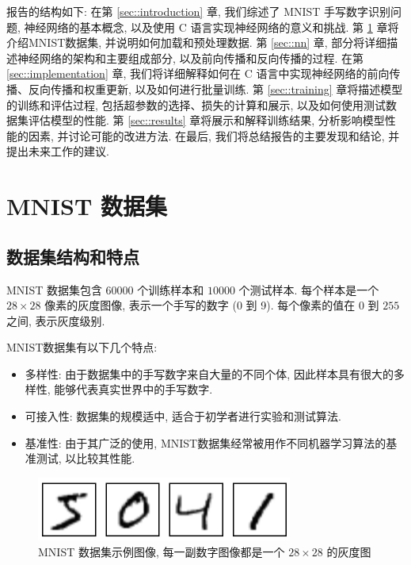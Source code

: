 \documentclass{ctexart}
\begin{document}
报告的结构如下: 在第 \ref{sec::introduction} 章, 我们综述了 MNIST 手写数字识别问题,
神经网络的基本概念, 以及使用 C 语言实现神经网络的意义和挑战. 第 \ref{sec::mnist} 章将介绍MNIST数据集,
并说明如何加载和预处理数据. 第 \ref{sec::nn} 章,
部分将详细描述神经网络的架构和主要组成部分, 以及前向传播和反向传播的过程.
在第 \ref{sec::implementation} 章, 我们将详细解释如何在 C 语言中实现神经网络的前向传播、反向传播和权重更新,
以及如何进行批量训练. 第 \ref{sec::training} 章将描述模型的训练和评估过程, 包括超参数的选择、损失的计算和展示,
以及如何使用测试数据集评估模型的性能. 第 \ref{sec::results} 章将展示和解释训练结果, 分析影响模型性能的因素,
并讨论可能的改进方法. 在最后, 我们将总结报告的主要发现和结论, 并提出未来工作的建议.

\section{MNIST 数据集}
\label{sec::mnist}

\subsection{数据集结构和特点}

MNIST 数据集包含 $60000$ 个训练样本和 $10000$ 个测试样本. 每个样本是一个 $28\times 28$ 像素的灰度图像,
表示一个手写的数字 (0 到 9). 每个像素的值在 $0$ 到 $255$ 之间, 表示灰度级别.

MNIST数据集有以下几个特点:

\begin{itemize}
    \item 多样性: 由于数据集中的手写数字来自大量的不同个体, 因此样本具有很大的多样性, 能够代表真实世界中的手写数字.
    \item 可接入性: 数据集的规模适中, 适合于初学者进行实验和测试算法.
    \item 基准性: 由于其广泛的使用, MNIST数据集经常被用作不同机器学习算法的基准测试, 以比较其性能.
\end{itemize}

\begin{figure}[htbp!]
    \centering
    \includegraphics[width=0.75\textwidth]{images/5.png}
    \caption{MNIST 数据集示例图像, 每一副数字图像都是一个 $28 \times 28$ 的灰度图}
    \label{fig:mnist}
\end{figure}
\end{document}
